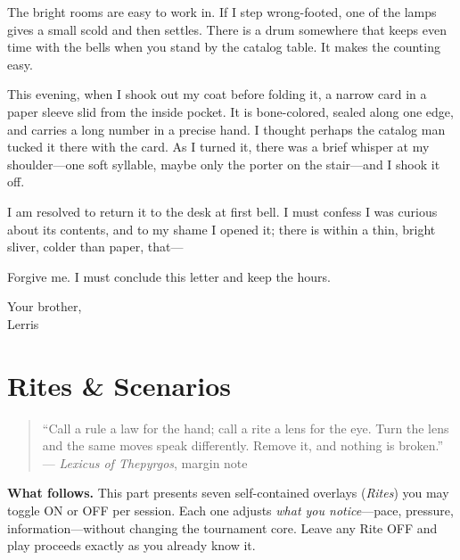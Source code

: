 \documentclass[11pt]{article}
\numberwithin{equation}{section} %
\theoremstyle{plain} %
\theoremstyle{definition} %
\theoremstyle{remark} %
\begin{document}
The bright rooms are easy to work in. If I step wrong-footed, one of the lamps gives a small scold and then settles. There is a drum somewhere that keeps even time with the bells when you stand by the catalog table. It makes the counting easy.

This evening, when I shook out my coat before folding it, a narrow card in a paper sleeve slid from the inside pocket. It is bone-colored, sealed along one edge, and carries a long number in a precise hand. I thought perhaps the catalog man tucked it there with the card. As I turned it, there was a brief whisper at my shoulder—one soft syllable, maybe only the porter on the stair—and I shook it off.

I am resolved to return it to the desk at first bell. I must confess I was curious about its contents, and to my shame I opened it; there is within a thin, bright sliver, colder than paper, that—

\medskip
\noindent Forgive me. I must conclude this letter and keep the hours.

\medskip
\noindent Your brother, \\
Lerris

\clearpage


\section{Rites \& Scenarios}
\label{part:rites}

\begin{quote}\small
``Call a rule a law for the hand; call a rite a lens for the eye.  
Turn the lens and the same moves speak differently. Remove it, and nothing is broken.''\\
\hfill — \textit{Lexicus of Thepyrgos}, margin note
\end{quote}

\noindent\textbf{What follows.} This part presents seven self-contained overlays (\emph{Rites}) you may toggle \textsc{ON} or \textsc{OFF} per session. Each one adjusts \textit{what you notice}—pace, pressure, information—without changing the tournament core. Leave any Rite \textsc{OFF} and play proceeds exactly as you already know it.
\end{document}
